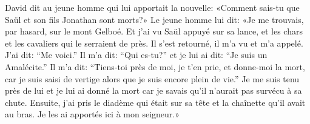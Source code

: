 David dit au jeune homme qui lui apportait la nouvelle:
	«Comment sais-tu que Saül et son fils Jonathan sont morts?»
Le jeune homme lui dit: «Je me trouvais, par hasard, sur le mont Gelboé.
	Et j’ai vu Saül appuyé sur sa lance,
	et les chars et les cavaliers qui le serraient de près.
Il s’est retourné, il m’a vu et m’a appelé.
	J’ai dit: “Me voici.”
Il m’a dit: “Qui es-tu?”
	et je lui ai dit: “Je suis un Amalécite.”
Il m’a dit: “Tiens-toi près de moi, je t’en prie, et donne-moi la mort,
	car je suis saisi de vertige alors que je suis encore plein de vie.”
Je me suis tenu près de lui et je lui ai donné la mort
	car je savais qu’il n’aurait pas survécu à sa chute.
Ensuite, j’ai pris le diadème qui était sur sa tête et la chaînette qu’il avait au bras.
	Je les ai apportés ici à mon seigneur.»
